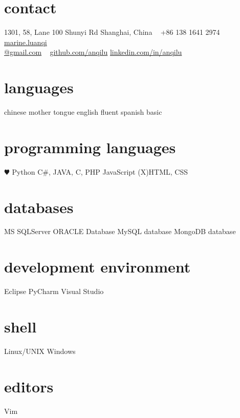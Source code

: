 \documentclass[]{friggeri-cv} %
\begin{document}


\begin{aside} %
\section{contact}
1301, 58, Lane 100
Shunyi Rd
Shanghai, China
~
+86 138 1641 2974
~
\href{mailto:marie.luanqi@gmail.com}{marine.luanqi\\@gmail.com}
~
\href{https://github.com/anqilu}{github.com/anqilu}
\href{https://www.linkedin.com/in/anqilu}{linkedin.com/in/anqilu}
\section{languages}
chinese mother tongue
english fluent
spanish basic
\section{programming languages}
{\color{red} $\varheartsuit$} Python
C\#, JAVA, C, PHP
JavaScript
(X)HTML, CSS
\section{databases}
MS SQLServer
ORACLE Database 
MySQL database
MongoDB database
\section{development environment}
Eclipse
PyCharm
Visual Studio
\section{shell}
Linux/UNIX
Windows
\section{editors}
Vim
\end{aside}
\end{document}
